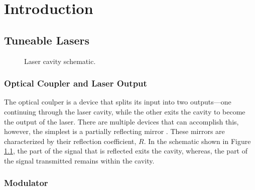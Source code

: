 
\chapter{Introduction}


\section{Tuneable Lasers}
\begin{figure}[tbp]
\centering

\caption[Laser Cavity]{Laser cavity schematic.}
\label{fig:cavity}
\end{figure}

\subsection{Optical Coupler and Laser Output}
The optical coulper is a device that splits its input into two outputs---one continuing through the laser cavity, while the other exits the cavity to become the output of the laser. There are multiple devices that can accomplish this, however, the simplest is a partially reflecting mirror \cite{alazzawi}. These mirrors are characterized by their reflection coefficient, $R$. In the schematic shown in Figure \ref{fig:cavity}, the part of the signal that is reflected exits the cavity, whereas, the part of the signal transmitted remains within the cavity. \\

\subsection{Modulator}

